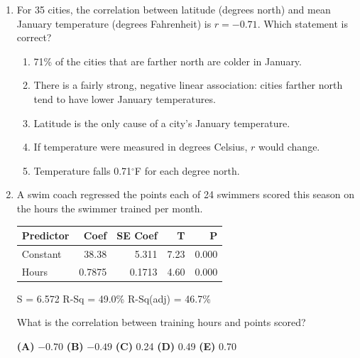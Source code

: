 \documentclass[12pt]{article}
\begin{document}
\begin{enumerate}[leftmargin=1.9em, itemsep=0.13in]
  \boxguard[11]
  \item For 35 cities, the correlation between latitude (degrees north) and mean January
        temperature (degrees Fahrenheit) is $r = -0.71$. Which statement is correct?
        \begin{enumerate}[label=\textbf{(\Alph*)}, leftmargin=2.2em, itemsep=2pt]
          \item 71\% of the cities that are farther north are colder in January.
          \item There is a fairly strong, negative linear association: cities farther north\\
                tend to have lower January temperatures.
          \item Latitude is the only cause of a city's January temperature.
          \item If temperature were measured in degrees Celsius, $r$ would change.
          \item Temperature falls 0.71$^\circ$F for each degree north.\hfill{}\rule[-0.2in]{0pt}{0.48in}
        \end{enumerate}

  \boxguard[11]
  \item A swim coach regressed the points each of 24 swimmers scored this season on the hours
        the swimmer trained per month.

        \vspace{2pt}
        {\centering\footnotesize\ttfamily
        \begin{tabular}{@{} l r r r r @{}}
        Predictor & Coef & SE Coef & T & P \\ \hline
        Constant & 38.38 & 5.311 & 7.23 & 0.000 \\
        Hours & 0.7875 & 0.1713 & 4.60 & 0.000 \\
        \end{tabular}\par
        S = 6.572 \quad R-Sq = 49.0\% \quad R-Sq(adj) = 46.7\%\par}
        \vspace{2pt}

        What is the correlation between training hours and points scored?\hfill{}\rule[-0.2in]{0pt}{0.48in}
        \par\vspace{3pt}\noindent
        \hspace{1.2em}\textbf{(A)} $-0.70$ \hfill \textbf{(B)} $-0.49$ \hfill
        \textbf{(C)} 0.24 \hfill \textbf{(D)} 0.49 \hfill \textbf{(E)} 0.70


\end{enumerate}
\end{document}
